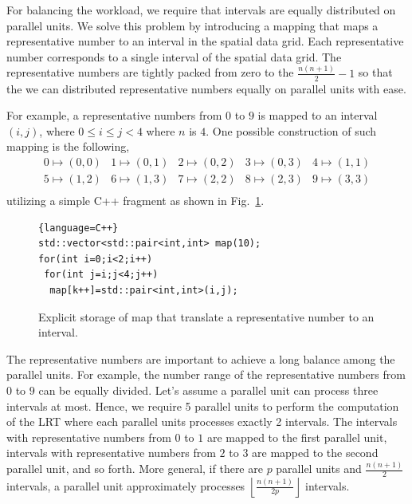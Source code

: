 \documentclass[AMA,LATO1COL]{WileyNJD-v2}
\begin{document}
For balancing the workload, we require that intervals are equally distributed on parallel units. We solve this problem by introducing a mapping that maps a representative number to an interval in the spatial data grid. Each representative number corresponds to a single interval of the spatial data grid. The representative numbers are tightly packed from zero to the $\frac{n(n+1)}{2}-1$ so that the we can distributed representative numbers equally on parallel units with ease.

For example, a representative numbers from $0$ to $9$ is mapped to an interval $(i,j)$,  where $0 \leq i \leq j < 4$ where $n$ is $4$.  One possible construction of such mapping is the following,
\begin{equation*}
\begin{array}{lllll}
0 \mapsto (0,0)  &
1 \mapsto (0,1)  &
2 \mapsto (0,2)  &
3 \mapsto (0,3)  &
4 \mapsto (1,1)  \\
5 \mapsto (1,2)  &
6 \mapsto (1,3)  &
7 \mapsto (2,2) &
8 \mapsto (2,3) &
9 \mapsto (3,3) \\
\end{array}
\end{equation*}
utilizing a simple C++ fragment as shown in Fig.~\ref{alg:explicit-map}.
\begin{figure}
\begin{lstlisting}{language=C++}
std::vector<std::pair<int,int> map(10);
for(int i=0;i<2;i++)
 for(int j=i;j<4;j++)
  map[k++]=std::pair<int,int>(i,j);
\end{lstlisting}
\caption{Explicit storage of map that translate a representative number to an interval.}
\label{alg:explicit-map}
\end{figure}
The representative numbers are important to achieve a long balance among the parallel units.  For example, the number range of the representative numbers from $0$ to $9$ can be equally divided. Let's assume a parallel unit can process three intervals at most. Hence, we require 5 parallel units to perform the computation of the LRT where each parallel units processes exactly 2 intervals. The intervals with representative numbers from $0$ to $1$ are mapped to the first parallel unit, intervals with representative numbers from $2$ to $3$ are mapped to the second parallel unit, and so forth. More general, if there are $p$ parallel units and $\frac{n(n+1)}{2}$ intervals, a parallel unit  approximately processes $\left \lfloor \frac{n(n+1)}{2 p} \right\rfloor$ intervals.
\end{document}
